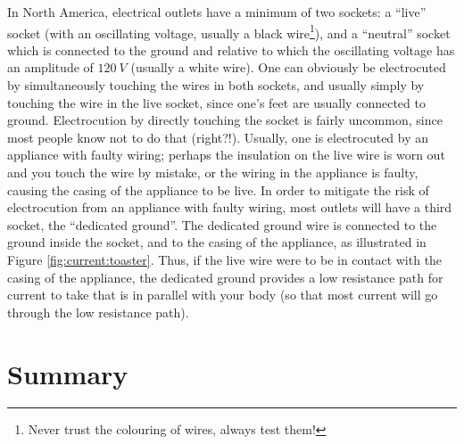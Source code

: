 In North America, electrical outlets have a minimum of two sockets: a ``live'' socket (with an oscillating voltage, usually a black wire\footnote{Never trust the colouring of wires, always test them!}), and a ``neutral'' socket which is connected to the ground and relative to which the oscillating voltage has an amplitude of $\SI{120}{V}$ (usually a white wire). One can obviously be electrocuted by simultaneously touching the wires in both sockets, and usually simply by touching the wire in the live socket, since one's feet are usually connected to ground. Electrocution by directly touching the socket is fairly uncommon, since most people know not to do that (right?!). Usually, one is electrocuted by an appliance with faulty wiring; perhaps the insulation on the live wire is worn out and you touch the wire by mistake, or the wiring in the appliance is faulty, causing the casing of the appliance to be live. In order to mitigate the risk of electrocution from an appliance with faulty wiring, most outlets will have a third socket, the ``dedicated ground''. The dedicated ground wire is connected to the ground inside the socket, and to the casing of the appliance, as illustrated in Figure \ref{fig:current:toaster}. Thus, if the live wire were to be in contact with the casing of the appliance, the dedicated ground provides a low resistance path for current to take that is in parallel with your body (so that most current will go through the low resistance path).

\newpage
\section{Summary}

